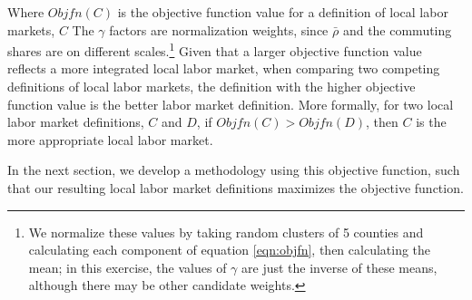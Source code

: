 Where $Objfn(C)$ is the objective function value for a definition of local labor markets, $C$ The $\gamma$ factors are normalization weights, since $\bar{\rho}$ and the commuting shares are on different scales.\footnote{We normalize these values by taking random clusters of 5 counties and calculating each component of equation \ref{eqn:objfn}, then calculating the mean; in this exercise, the values of $\gamma$ are just the inverse of these means, although there may be other candidate weights.} Given that a larger objective function value reflects a more integrated local labor market, when comparing two competing definitions of local labor markets, the definition with the higher objective function value is the better labor market definition. More formally, for two local labor market definitions, $C$ and $D$, if $Objfn(C)>Objfn(D)$, then $C$ is the more appropriate local labor market.

In the next section, we develop a methodology using this objective function, such that our resulting local labor market definitions maximizes the objective function.



%


